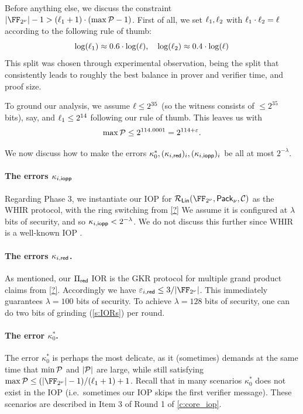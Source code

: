 \documentclass[11pt,letterpaper,usenames,dvipsnames]{article}
\begin{document}
Before anything else, we discuss the constraint  $|\comfield|-1 >  (\codedim_1 + 1) \cdot (\max\cP-1)$. 
%
First of all, we set $\ell_1, \ell_2$ with $\ell_1\cdot \ell_2 = \ell$ according to the following rule of thumb:
%
$$
\log(\ell_1) \approx 0.6 \cdot \log(\ell), \quad \log(\ell_2) \approx 0.4\cdot \log(\ell)
$$
%
This split was chosen through experimental observation, being the split that consistently leads to roughly the best balance in prover and verifier time, and proof size.  


To ground our analysis, we assume $\ell\leq2^{35}$ (so the witness consists of $\leq 2^{35}$ bits), say, and $\ell_1 \leq 2^{14}$ following our rule of thumb.  This leaves us with $$\max\mathcal{P} \leq 2^{114.0001} = 2^{114 + \varepsilon}.$$ 

We now discuss how to make the errors $\kappa_0^*, (\kappa_{i,\mathsf{red}})_i, (\kappa_{i,\mathsf{iopp}})_i$ be all at most $2^{-\lambda}$. 


\paragraph{The errors $\kappa_{i,\mathsf{iopp}}$} Regarding Phase 3, we instantiate our IOP for $\LIN(\comfield, \pack, \cC)$ as the WHIR protocol, with the ring switching from \cref{?}   We assume it is configured at $\lambda$ bits of security, and so $\kappa_{i,\mathsf{iopp}}< 2^{-\lambda}$. We do not discuss this further since WHIR is a well-known IOP .

\paragraph{The errors $\kappa_{i,\mathsf{red}}$.} As mentioned, our $\Pi_{\mathsf{red}}$ IOR is the GKR protocol for multiple grand product claims from \cref{?}. Accordingly we have $\eps_{i,\red}\leq 3/|\comfield|$. This immediately guarantees $\lambda=100$ bits of security. To achieve $\lambda=128$ bits of security, one can do two bits of grinding (\cref{s:IORs}) per round. 


\paragraph{The error $\kappa_0^*$.}
 The error $\kappa_0^*$ is perhaps the most delicate, as it (sometimes) demands at the same time that $\min\mathcal{P}$ and  $|\mathcal{P}|$ are large, while still satisfying $\max\cP \leq (|\comfield|-1)/(\codedim_1 + 1) +1$. Recall that in many scenarios $\kappa_0^*$ does not exist in the IOP  (i.e.\ sometimes our IOP skips the first verifier message).  These scenarios are described in Item 3 of Round 1 of \cref{c:core_iop}. 
\end{document}
